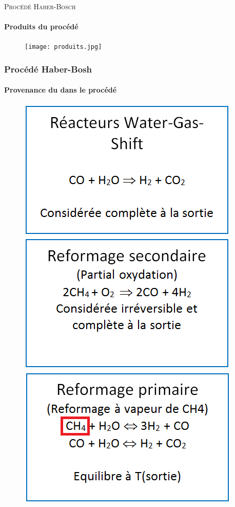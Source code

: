 \documentclass{beamer}
\begin{document}
\begin{frame}{\textsc{Procédé Haber-Bosch}}
	\framesubtitle{Produits du procédé}
	\begin{figure}
	\centering
	\texttt{[image: produits.jpg]}
	\end{figure}
\end{frame}

\begin{frame}
\frametitle{Procédé Haber-Bosh}

\framesubtitle{Provenance du  dans le procédé}
\begin{figure} [ht!]
\centering
\includegraphics[scale=0.3] {Bloc_WGS.png}
\includegraphics[scale=0.3] {Bloc_refsec.png}
\includegraphics[scale=0.3] {Bloc_refprim.png}
\end {figure}
\end{frame}
\end{document}
